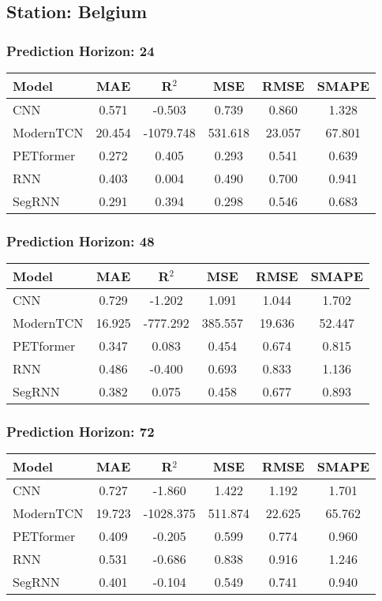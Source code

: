 \subsection*{Station: Belgium}
\subsubsection*{Prediction Horizon: 24}
\begin{tabular}{lccccc}
\toprule
Model & MAE & R$^2$ & MSE & RMSE & SMAPE \\
\midrule
CNN & 0.571 & -0.503 & 0.739 & 0.860 & 1.328 \\
ModernTCN & 20.454 & -1079.748 & 531.618 & 23.057 & 67.801 \\
PETformer & 0.272 & 0.405 & 0.293 & 0.541 & 0.639 \\
RNN & 0.403 & 0.004 & 0.490 & 0.700 & 0.941 \\
SegRNN & 0.291 & 0.394 & 0.298 & 0.546 & 0.683 \\
\bottomrule
\end{tabular}
\vspace{0.5cm}
\subsubsection*{Prediction Horizon: 48}
\begin{tabular}{lccccc}
\toprule
Model & MAE & R$^2$ & MSE & RMSE & SMAPE \\
\midrule
CNN & 0.729 & -1.202 & 1.091 & 1.044 & 1.702 \\
ModernTCN & 16.925 & -777.292 & 385.557 & 19.636 & 52.447 \\
PETformer & 0.347 & 0.083 & 0.454 & 0.674 & 0.815 \\
RNN & 0.486 & -0.400 & 0.693 & 0.833 & 1.136 \\
SegRNN & 0.382 & 0.075 & 0.458 & 0.677 & 0.893 \\
\bottomrule
\end{tabular}
\vspace{0.5cm}
\subsubsection*{Prediction Horizon: 72}
\begin{tabular}{lccccc}
\toprule
Model & MAE & R$^2$ & MSE & RMSE & SMAPE \\
\midrule
CNN & 0.727 & -1.860 & 1.422 & 1.192 & 1.701 \\
ModernTCN & 19.723 & -1028.375 & 511.874 & 22.625 & 65.762 \\
PETformer & 0.409 & -0.205 & 0.599 & 0.774 & 0.960 \\
RNN & 0.531 & -0.686 & 0.838 & 0.916 & 1.246 \\
SegRNN & 0.401 & -0.104 & 0.549 & 0.741 & 0.940 \\
\bottomrule
\end{tabular}
\vspace{0.5cm}
